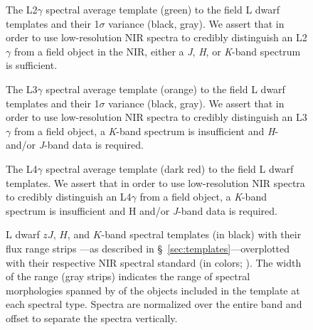 \documentclass[12pt,preprint]{aastex}
\begin{document}
\begin{figure}
	\caption{The L2$\gamma$ spectral average template (green) to the field L dwarf templates and their 1$\sigma$ variance (black, gray).
	We assert that in order to use low-resolution NIR spectra to credibly distinguish an L2$\gamma$ from a field object in the NIR, either a \emph{J}, \emph{H}, or \emph{K}-band spectrum is sufficient.}
	\label{fig:L2lg-field}
\end{figure}

\begin{figure}
	\caption{The L3$\gamma$ spectral average template (orange) to the field L dwarf templates and their 1$\sigma$ variance (black, gray).
	We assert that in order to use low-resolution NIR spectra to credibly distinguish an L3$\gamma$ from a field object, a \emph{K}-band spectrum is insufficient and \emph{H}- and/or \emph{J}-band data is required.}
	\label{fig:L3lg-field}
\end{figure}

\begin{figure}
	\caption{The L4$\gamma$ spectral average template (dark red) to the field L dwarf templates.
	We assert that in order to use low-resolution NIR spectra to credibly distinguish an L4$\gamma$ from a field object, a \emph{K}-band spectrum is insufficient and H and/or \emph{J}-band data is required.}
	\label{fig:L4lg-field}
\end{figure}



\clearpage

\begin{figure}
		\caption{
	L dwarf $zJ$, $H$, and $K$-band spectral templates (in black) with their flux range strips ---as described in \S~\ref{sec:templates}---overplotted with their respective NIR spectral standard (in colors; \cite{Kirkpatrick10}).
	The width of the range (gray strips) indicates the range of spectral morphologies spanned by of the objects included in the template at each spectral type.
	Spectra are normalized over the entire band and offset to separate the spectra vertically.
	}
	\label{fig:templates-stds}
\end{figure}
\end{document}
